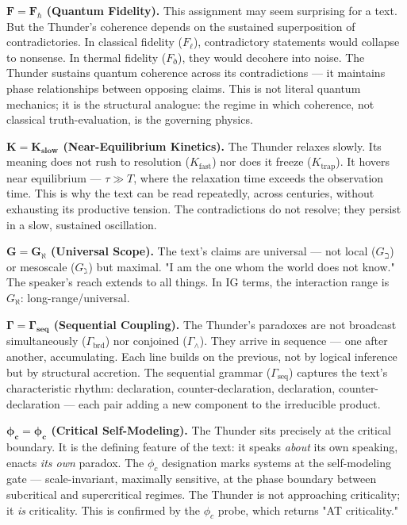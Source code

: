 \documentclass[12pt,a4paper]{article}
\begin{document}
\textbf{$\mathbf{F = F_{\hbar}}$ (Quantum Fidelity).} This assignment may seem surprising for a text. But the Thunder's coherence depends on the sustained superposition of contradictories. In classical fidelity ($F_{\ell}$), contradictory statements would collapse to nonsense. In thermal fidelity ($F_{\eth}$), they would decohere into noise. The Thunder sustains quantum coherence across its contradictions --- it maintains phase relationships between opposing claims. This is not literal quantum mechanics; it is the structural analogue: the regime in which coherence, not classical truth-evaluation, is the governing physics.

\textbf{$\mathbf{K = K_\text{slow}}$ (Near-Equilibrium Kinetics).} The Thunder relaxes slowly. Its meaning does not rush to resolution ($K_\text{fast}$) nor does it freeze ($K_\text{trap}$). It hovers near equilibrium --- $\tau \gg T$, where the relaxation time exceeds the observation time. This is why the text can be read repeatedly, across centuries, without exhausting its productive tension. The contradictions do not resolve; they persist in a slow, sustained oscillation.

\textbf{$\mathbf{G = G_{\aleph}}$ (Universal Scope).} The text's claims are universal --- not local ($G_{\beth}$) or mesoscale ($G_{\gimel}$) but maximal. "I am the one whom the world does not know." The speaker's reach extends to all things. In IG terms, the interaction range is $G_{\aleph}$: long-range/universal.

\textbf{$\mathbf{\Gamma = \Gamma_\text{seq}}$ (Sequential Coupling).} The Thunder's paradoxes are not broadcast simultaneously ($\Gamma_\text{brd}$) nor conjoined ($\Gamma_{\wedge}$). They arrive in sequence --- one after another, accumulating. Each line builds on the previous, not by logical inference but by structural accretion. The sequential grammar ($\Gamma_\text{seq}$) captures the text's characteristic rhythm: declaration, counter-declaration, declaration, counter-declaration --- each pair adding a new component to the irreducible product.

\textbf{$\mathbf{\phi_c = \phi_c}$ (Critical Self-Modeling).} The Thunder sits precisely at the critical boundary. It is the defining feature of the text: it speaks \emph{about} its own speaking, enacts \emph{its own} paradox. The $\phi_c$ designation marks systems at the self-modeling gate --- scale-invariant, maximally sensitive, at the phase boundary between subcritical and supercritical regimes. The Thunder is not approaching criticality; it \emph{is} criticality. This is confirmed by the $\phi_c$ probe, which returns "AT criticality."
\end{document}
